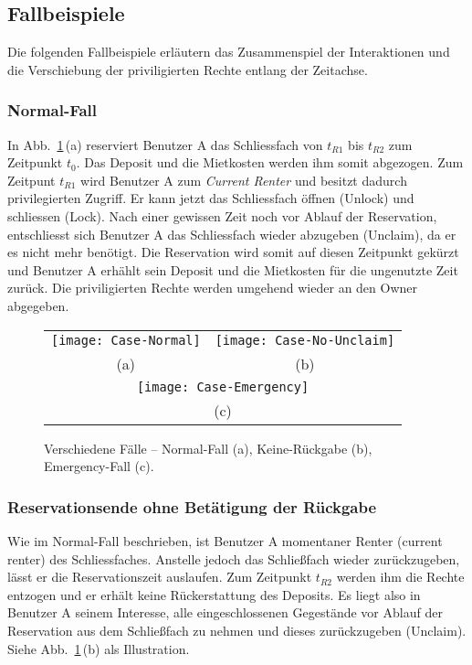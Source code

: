 \subsection{Fallbeispiele}
\label{sec:Fallbeispiele}
Die folgenden Fallbeispiele erläutern das Zusammenspiel der Interaktionen und die Verschiebung der priviligierten Rechte entlang der Zeitachse.

\subsubsection{Normal-Fall}
In Abb.~\ref{fig:Cases}\,(a) reserviert Benutzer A das Schliessfach von $t_{R1}$ bis $t_{R2}$ zum Zeitpunkt $t_0$. Das Deposit und die Mietkosten werden ihm somit abgezogen.
Zum Zeitpunt $t_{R1}$ wird Benutzer A zum \emph{Current Renter} und besitzt dadurch privilegierten Zugriff. Er kann jetzt das Schliessfach öffnen (Unlock) und schliessen (Lock). Nach einer gewissen Zeit noch vor Ablauf der Reservation, entschliesst sich Benutzer A das Schliessfach wieder abzugeben (Unclaim), da er es nicht mehr benötigt. Die Reservation wird somit auf diesen Zeitpunkt gekürzt und Benutzer A erhählt sein Deposit und die Mietkosten für die ungenutzte Zeit zurück. Die priviligierten Rechte werden umgehend wieder an den Owner abgegeben.

\begin{figure}
\centering\small
\setlength{\tabcolsep}{0mm}	%
\begin{tabular}{c@{\hspace{12mm}}c} %
  \texttt{[image: Case-Normal]} &
  \texttt{[image: Case-No-Unclaim]} \\
  (a) & (b)
  \\[1em]	%
  \multicolumn{2}{c}{\texttt{[image: Case-Emergency]}}\\
  \multicolumn{2}{c}{(c)} 
\end{tabular}
%
\caption{Verschiedene Fälle -- 
Normal-Fall (a), Keine-Rückgabe (b),
Emergency-Fall (c).}
\label{fig:Cases}
\end{figure}


\subsubsection{Reservationsende ohne Betätigung der Rückgabe}
Wie im Normal-Fall beschrieben, ist Benutzer A momentaner Renter (current renter) des Schliessfaches. Anstelle jedoch das Schließfach wieder zurückzugeben, lässt er die Reservationszeit auslaufen. Zum Zeitpunkt $t_{R2}$ werden ihm die Rechte entzogen und er erhält keine Rückerstattung des Deposits. Es liegt also in Benutzer A seinem Interesse, alle eingeschlossenen Gegestände vor Ablauf der Reservation aus dem Schließfach zu nehmen und dieses zurückzugeben (Unclaim). Siehe Abb.~\ref{fig:Cases}\,(b) als Illustration.

